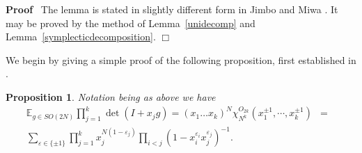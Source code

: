 \documentclass[11pt]{amsart}
\newtheorem{proposition}{Proposition}
\renewenvironment{proof}{
\noindent\textbf{Proof}\ }{\hspace*{\fill}
\begin{math}\Box\end{math}\medskip}
\begin{document}
\medbreak
\begin{proof}
  The lemma is stated in slightly different form in Jimbo and Miwa
  {\cite{JM}}. It may be proved by the method of  Lemma~\ref{unidecomp}
  and
  Lemma~\ref{symplecticdecomposition}.
\end{proof}

We begin by giving a simple proof of the following proposition,
first established in {\cite{CFKRS2}}.

\begin{proposition}
  \label{soprod}Notation being as above we have
  \begin{eqnarray}
    \mathbb{E}_{g \in SO ( 2 N )} \prod_{j = 1}^k \det ( I + x_j g ) = ( x_1
    \ldots x_k )^N \chi_{N^k}^{O_{2 k}} ( x_1^{\pm 1}, \cdots, x_k^{\pm 1} ) &
    = &  \nonumber\\
    \sum_{\varepsilon \in \{ \pm 1 \}} \prod_{j = 1}^k x_j^{N ( 1 -
    \varepsilon_j )} \prod_{i < j} ( 1 - x_i^{\varepsilon_i}
    x_j^{\varepsilon_j} )^{- 1} . &  &  \label{e:soprod}
  \end{eqnarray}
\end{proposition}
\end{document}
